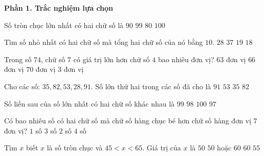 \textbf{Phần 1. Trắc nghiệm lựa chọn}

\begin{ex} %
Số tròn chục lớn nhất có hai chữ số là
\choice
{\True $90$}
{$99$}
{$80$}
{$100$}
\end{ex}

\begin{ex} %
Tìm số nhỏ nhất có hai chữ số mà tổng hai chữ số của nó bằng $10$.
\choice
{$28$}
{$37$}
{\True $19$}
{$18$}
\end{ex}

\begin{ex} %
Trong số $74$, chữ số $7$ có giá trị lớn hơn chữ số $4$ bao nhiêu đơn vị?
\choice
{$63$ đơn vị}
{\True $66$ đơn vị}
{$70$ đơn vị}
{$3$ đơn vị}
\end{ex}

\begin{ex} %
Cho các số: $35, 82, 53, 28, 91$. Số lớn thứ hai trong các số đã cho là
\choice
{$91$}
{$53$}
{$35$}
{\True $82$}
\end{ex}

\begin{ex} %
Số liền sau của số lớn nhất có hai chữ số khác nhau là
\choice
{\True $99$}
{$98$}
{$100$}
{$97$}
\end{ex}

\begin{ex} %
Có bao nhiêu số có hai chữ số mà chữ số hàng chục bé hơn chữ số hàng đơn vị $7$ đơn vị?
\choice
{$1$ số}
{$3$ số}
{\True $2$ số}
{$4$ số}
\end{ex}

\begin{ex} %
Tìm $x$ biết $x$ là số tròn chục và $45 < x < 65$. Giá trị của $x$ là
\choice
{$50$}
{\True $50\text{ hoặc } 60$}
{$60$}
{$55$}
\end{ex}


